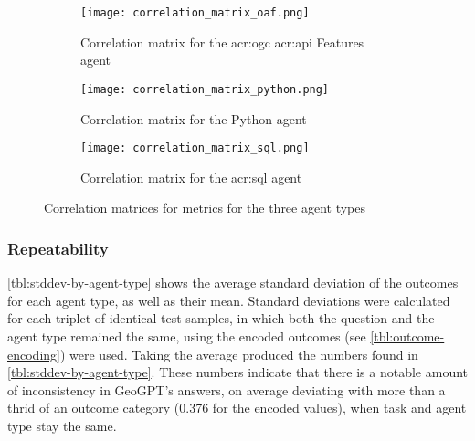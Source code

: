 \begin{figure}[htp]
    \centering

    \begin{subfigure}[b]{\textwidth}
        \texttt{[image: correlation\_matrix\_oaf.png]}
        \caption{Correlation matrix for the \acrshort{acr:ogc} \acrshort{acr:api} Features agent}
        \label{fig:sub1}
    \end{subfigure}

    \vspace{1cm}

    \begin{subfigure}[b]{\textwidth}
        \texttt{[image: correlation\_matrix\_python.png]}
        \caption{Correlation matrix for the Python agent}
        \label{fig:sub2}
    \end{subfigure}

    \vspace{1cm}

    \begin{subfigure}[b]{\textwidth}
        \texttt{[image: correlation\_matrix\_sql.png]}
        \caption{Correlation matrix for the \acrshort{acr:sql} agent}
        \label{fig:sub3}
    \end{subfigure}

    \caption{Correlation matrices for metrics for the three agent types}
    \label{fig:correlation-matrices}
\end{figure}

\subsubsection{Repeatability}

\autoref{tbl:stddev-by-agent-type} shows the average standard deviation of the outcomes for each agent type, as well as their mean. Standard deviations were calculated for each triplet of identical test samples, in which both the question and the agent type remained the same, using the encoded outcomes (see \autoref{tbl:outcome-encoding}) were used. Taking the average produced the numbers found in \autoref{tbl:stddev-by-agent-type}. These numbers indicate that there is a notable amount of inconsistency in GeoGPT's answers, on average deviating with more than a thrid of an outcome category (0.376 for the encoded values), when task and agent type stay the same.

